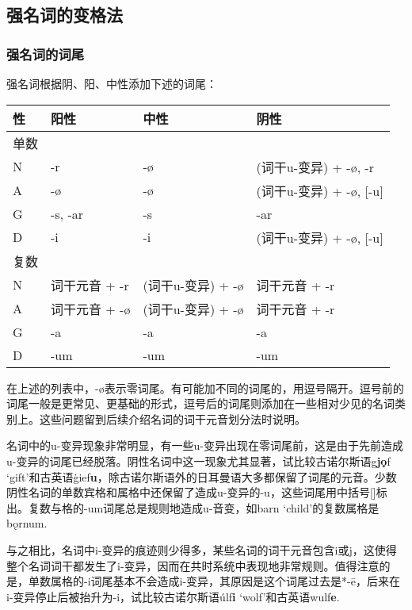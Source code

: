 \subsection{强名词的变格法}\label{ux5f3aux540dux8bcdux7684ux53d8ux683cux6cd5}

\subsubsection{强名词的词尾}\label{ux5f3aux540dux8bcdux7684ux8bcdux5c3e}

强名词根据阴、阳、中性添加下述的词尾：

\begin{longtable}{llll}
\toprule
性 & 阳性 & 中性 & 阴性 \\
\midrule
\endhead
\bottomrule
\endfoot
单数 & & & \\
N & -r & -ø & (词干u-变异) + -ø, -r \\
A & -ø & -ø & (词干u-变异) + -ø, {[}-u{]} \\
G & -s, -ar & -s & -ar \\
D & -i & -i & (词干u-变异) + -ø, {[}-u{]} \\
复数 & & & \\
N & 词干元音 + -r & (词干u-变异) + -ø & 词干元音 + -r \\
A & 词干元音 + -ø & (词干u-变异) + -ø & 词干元音 + -r \\
G & -a & -a & -a \\
D & -um & -um & -um \\
\end{longtable}

在上述的列表中，-ø表示零词尾。有可能加不同的词尾的，用逗号隔开。逗号前的词尾一般是更常见、更基础的形式，逗号后的词尾则添加在一些相对少见的名词类别上。这些问题留到后续介绍名词的词干元音划分法时说明。

名词中的u-变异现象非常明显，有一些u-变异出现在零词尾前，这是由于先前造成u-变异的词尾已经脱落。阴性名词中这一现象尤其显著，试比较古诺尔斯语g\textbf{jǫ}f
`gift'和古英语ġief\textbf{u}，除古诺尔斯语外的日耳曼语大多都保留了词尾的元音。少数阴性名词的单数宾格和属格中还保留了造成u-变异的-u，这些词尾用中括号{[}{]}标出。复数与格的-um词尾总是规则地造成u-音变，如barn
`child'的复数属格是bǫrnum.

与之相比，名词中i-变异的痕迹则少得多，某些名词的词干元音包含i或j，这使得整个名词词干都发生了i-变异，因而在共时系统中表现地非常规则。值得注意的是，单数属格的-i词尾基本不会造成i-变异，其原因是这个词尾过去是*-ē，后来在i-变异停止后被抬升为-i，试比较古诺尔斯语úlf\textbf{i}
`wolf'和古英语wulf\textbf{e}.

